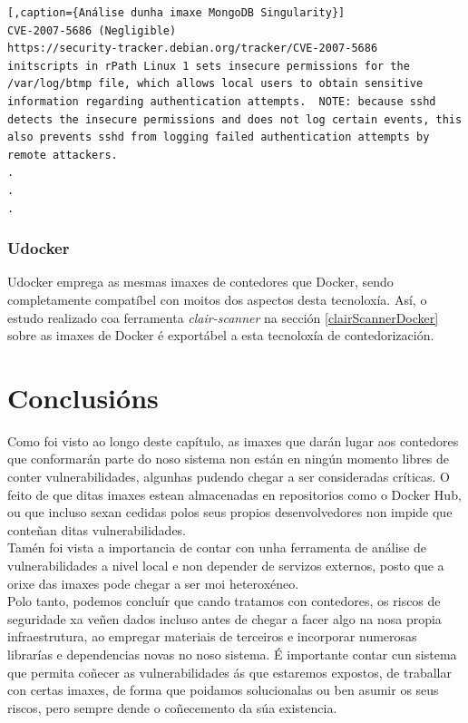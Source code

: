 \begin{lstlisting}[,caption={Análise dunha imaxe MongoDB Singularity}]
CVE-2007-5686 (Negligible)
https://security-tracker.debian.org/tracker/CVE-2007-5686
initscripts in rPath Linux 1 sets insecure permissions for the /var/log/btmp file, which allows local users to obtain sensitive information regarding authentication attempts.  NOTE: because sshd detects the insecure permissions and does not log certain events, this also prevents sshd from logging failed authentication attempts by remote attackers.
.
.
.
\end{lstlisting}

\subsubsection{Udocker}

Udocker emprega as mesmas imaxes de contedores que Docker, sendo completamente compatíbel con moitos dos aspectos desta tecnoloxía. Así, o estudo realizado coa ferramenta \textit{clair-scanner} na sección \ref{clairScannerDocker} sobre as imaxes de Docker é exportábel a esta tecnoloxía de contedorización.

\section{Conclusións}

Como foi visto ao longo deste capítulo, as imaxes que darán lugar aos contedores que conformarán parte do noso sistema non están en ningún momento libres de conter vulnerabilidades, algunhas pudendo chegar a ser consideradas críticas. O feito de que ditas imaxes estean almacenadas en repositorios como o Docker Hub, ou que incluso sexan cedidas polos seus propios desenvolvedores non impide que conteñan ditas vulnerabilidades.\\

Tamén foi vista a importancia de contar con unha ferramenta de análise de vulnerabilidades a nivel local e non depender de servizos externos, posto que a orixe das imaxes pode chegar a ser moi heteroxéneo.\\

Polo tanto, podemos concluír que cando tratamos con contedores, os riscos de seguridade xa veñen dados incluso antes de chegar a facer algo na nosa propia infraestrutura, ao empregar materiais de terceiros e incorporar numerosas librarías e dependencias novas no noso sistema. É importante contar cun sistema que permita coñecer as vulnerabilidades ás que estaremos expostos, de traballar con certas imaxes, de forma que poidamos solucionalas ou ben asumir os seus riscos, pero sempre dende o coñecemento da súa existencia.
